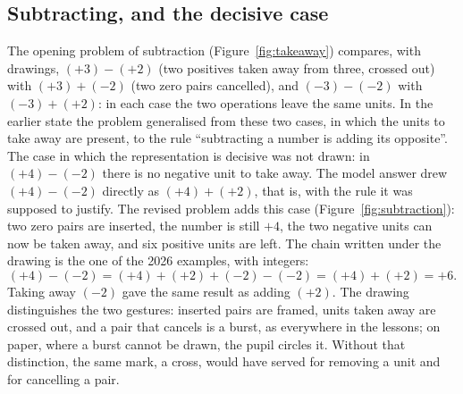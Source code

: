 \documentclass[11pt,a4paper]{article}
\theoremstyle{definition}
\begin{document}
\subsection{Subtracting, and the decisive case}\label{sec:subtraction}
The opening problem of subtraction (Figure~\ref{fig:takeaway}) compares, with drawings, $(+3)-(+2)$ (two positives taken away from three, crossed out) with $(+3)+(-2)$ (two zero pairs cancelled), and $(-3)-(-2)$ with $(-3)+(+2)$: in each case the two operations leave the same units. In the earlier state the problem generalised from these two cases, in which the units to take away are present, to the rule ``subtracting a number is adding its opposite''. The case in which the representation is decisive was not drawn: in $(+4)-(-2)$ there is no negative unit to take away. The model answer drew $(+4)-(-2)$ directly as $(+4)+(+2)$, that is, with the rule it was supposed to justify. The revised problem adds this case (Figure~\ref{fig:subtraction}): two zero pairs are inserted, the number is still $+4$, the two negative units can now be taken away, and six positive units are left. The chain written under the drawing is the one of the 2026 examples, with integers:
\[
(+4)-(-2)=(+4)+(+2)+(-2)-(-2)=(+4)+(+2)=+6 .
\]
Taking away $(-2)$ gave the same result as adding $(+2)$. The drawing distinguishes the two gestures: inserted pairs are framed, units taken away are crossed out, and a pair that cancels is a burst, as everywhere in the lessons; on paper, where a burst cannot be drawn, the pupil circles it. Without that distinction, the same mark, a cross, would have served for removing a unit and for cancelling a pair.
\end{document}
